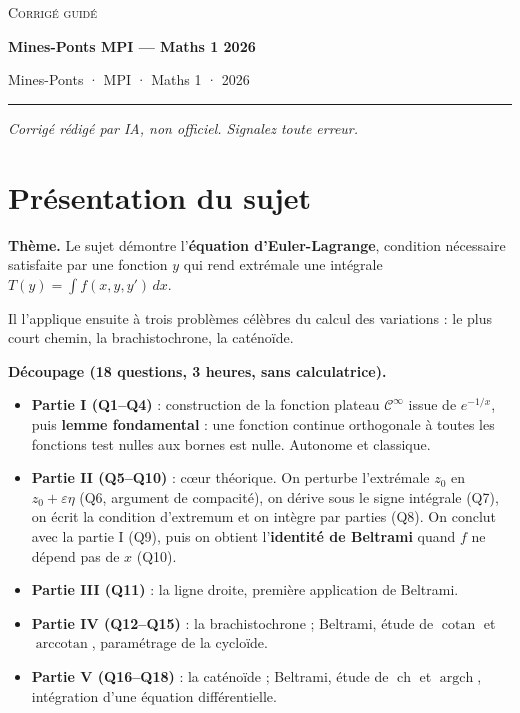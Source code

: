 \documentclass[11pt,a4paper]{article}
\providecommand{\tightlist}{\setlength{\itemsep}{0pt}\setlength{\parskip}{0pt}}
\begin{document}
\thispagestyle{plain}
\begin{center}
  {\small\scshape Corrigé guidé}\par\smallskip
  {\LARGE\bfseries Mines-Ponts MPI — Maths 1 2026\par}\medskip
  {\large Mines-Ponts · MPI · Maths 1 · 2026\par}
\end{center}
\vspace{2pt}\hrule\vspace{8pt}

\emph{Corrigé rédigé par IA, non officiel. Signalez toute erreur.}

\hypertarget{pruxe9sentation-du-sujet}{%
\section{Présentation du sujet}\label{pruxe9sentation-du-sujet}}

\textbf{Thème.} Le sujet démontre l'\textbf{équation d'Euler-Lagrange}, condition nécessaire satisfaite par une fonction \(y\) qui rend extrémale une intégrale \(T(y)=\int f(x,y,y')\,dx\).

Il l'applique ensuite à trois problèmes célèbres du calcul des variations : le plus court chemin, la brachistochrone, la caténoïde.

\textbf{Découpage (18 questions, 3 heures, sans calculatrice).}

\begin{itemize}
\tightlist
\item
  \textbf{Partie I (Q1--Q4)} : construction de la fonction plateau \(\mathcal C^\infty\) issue de \(e^{-1/x}\), puis \textbf{lemme fondamental} : une fonction continue orthogonale à toutes les fonctions test nulles aux bornes est nulle. Autonome et classique.
\item
  \textbf{Partie II (Q5--Q10)} : cœur théorique. On perturbe l'extrémale \(z_0\) en \(z_0+\varepsilon\eta\) (Q6, argument de compacité), on dérive sous le signe intégrale (Q7), on écrit la condition d'extremum et on intègre par parties (Q8). On conclut avec la partie I (Q9), puis on obtient l'\textbf{identité de Beltrami} quand \(f\) ne dépend pas de \(x\) (Q10).
\item
  \textbf{Partie III (Q11)} : la ligne droite, première application de Beltrami.
\item
  \textbf{Partie IV (Q12--Q15)} : la brachistochrone ; Beltrami, étude de \(\operatorname{cotan}\) et \(\operatorname{arccotan}\), paramétrage de la cycloïde.
\item
  \textbf{Partie V (Q16--Q18)} : la caténoïde ; Beltrami, étude de \(\operatorname{ch}\) et \(\operatorname{argch}\), intégration d'une équation différentielle.
\end{itemize}
\end{document}

